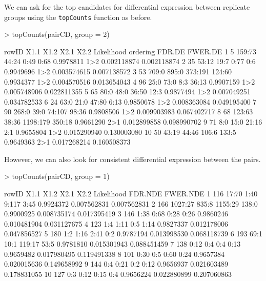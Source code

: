 \documentclass[a4paper]{article}
\begin{document}
We can ask for the top candidates for differential expression between replicate groups using the \verb'topCounts' function as before.
\begin{Schunk}
\begin{Sinput}
>   topCounts(pairCD, group = 2)
\end{Sinput}
\begin{Soutput}
   rowID   X1.1  X1.2     X2.1   X2.2 Likelihood ordering      FDR.DE     FWER.DE
1      5 159:73 44:24     0:49   0:68  0.9978811      1>2 0.002118874 0.002118874
2     35  53:12  19:7     0:77    0:6  0.9949696      1>2 0.003574615 0.007138572
3     53  709:0 895:0  373:191 124:60  0.9934377      1>2 0.004570516 0.013654043
4     96   25:0  73:0      8:3  36:13  0.9907159      1>2 0.005748906 0.022811355
5     65   80:0  48:0    36:50   12:3  0.9877494      1>2 0.007049251 0.034782533
6     24   63:0  21:0    47:80   6:13  0.9850678      1>2 0.008363084 0.049195400
7     90  268:0  39:0   74:107  98:36  0.9808506      1>2 0.009903983 0.067402717
8     68 123:63 38:36 1198:179 350:18  0.9661290      2>1 0.012899858 0.098990702
9     71    8:0  15:0    21:16    2:1  0.9655804      1>2 0.015290940 0.130003080
10    50  43:19 44:46    106:6  133:5  0.9649363      2>1 0.017268214 0.160508373
\end{Soutput}
\end{Schunk}
However, we can also look for consistent differential expression between the pairs. 
\begin{Schunk}
\begin{Sinput}
>   topCounts(pairCD, group = 1)
\end{Sinput}
\begin{Soutput}
   rowID    X1.1  X1.2    X2.1  X2.2 Likelihood     FDR.NDE    FWER.NDE
1    116   17:70  1:40   9:117  3:45  0.9924372 0.007562831 0.007562831
2    166 1027:27 835:8 1155:29 138:0  0.9900925 0.008735174 0.017395419
3    146    1:38  0:68    0:28  0:26  0.9860246 0.010481904 0.031127675
4    123     1:4  1:11     0:5  1:14  0.9827337 0.012178006 0.047856527
5    180     1:2  1:16    2:41   0:2  0.9787194 0.013998530 0.068118739
6    193    69:1  10:1  119:17  53:5  0.9781810 0.015301943 0.088451459
7    138    0:12   0:4     0:4  0:13  0.9659482 0.017980495 0.119491338
8    101    0:30   0:5    0:60  0:24  0.9657384 0.020015636 0.149658992
9    144     0:4  0:21     0:2  0:12  0.9656937 0.021603489 0.178831055
10   127     0:3  0:12    0:15   0:4  0.9656224 0.022880899 0.207060863
\end{Soutput}
\end{Schunk}
\end{document}
